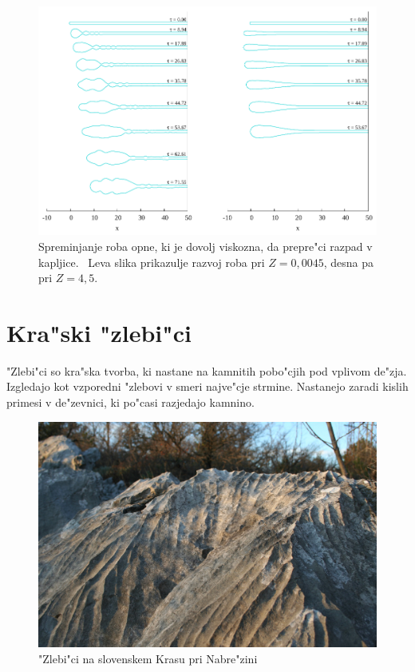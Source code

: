\documentclass[a4paper,10pt]{article}
\begin{document}
\begin{figure}[h]
  \centering
\includegraphics[width=.9\textwidth]{./Slike/scat-rezultat-1}
\caption{Spreminjanje roba opne, ki je dovolj viskozna, da prepre"ci razpad v kapljice.~\cite{scat}
Leva slika prikazulje razvoj roba pri $Z=0,0045$, desna pa pri $Z=4,5$. }
\label{fig:mehurcek-rez-vis-1}
\end{figure}

\clearpage
\section{Kra"ski "zlebi"ci}

"Zlebi"ci so kra"ska tvorba, ki nastane na kamnitih pobo"cjih pod vplivom de"zja. Izgledajo kot vzporedni "zlebovi v smeri najve"cje strmine. Nastanejo zaradi kislih primesi v de"zevnici, ki po"casi razjedajo kamnino. 

\begin{figure}[h]
\centering
 \includegraphics[width=.8\textwidth]{./Slike/Zlebici}
 \caption{"Zlebi"ci na slovenskem Krasu pri Nabre"zini~\cite{wiki:zlebic} }
 \label{fig:zlebici-slika}
\end{figure}
\end{document}
